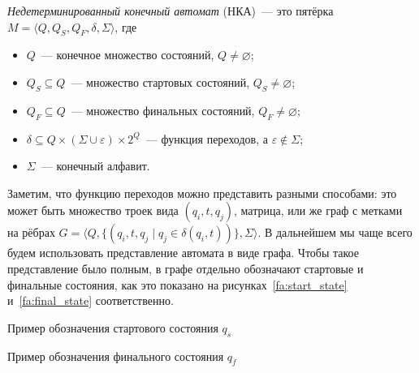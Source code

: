 \begin{definition}
    \label{def:NondeterminicticFiniteAutomata}
    \emph{Недетерминированный конечный автомат} (НКА)~--- это пятёрка $M = \langle Q, Q_S, Q_F, \delta, \Sigma \rangle$, где
    \begin{itemize}
        \item $Q$~--- конечное множество состояний, $Q \neq \varnothing$;
        \item $Q_S \subseteq Q$~--- множество стартовых состояний, $Q_S \neq \varnothing$;
        \item $Q_F \subseteq Q$~--- множество финальных состояний, $Q_F \neq \varnothing$;
        \item $\delta \subseteq Q \times (\Sigma \cup \varepsilon) \times 2^Q$~--- функция переходов, а $\varepsilon \notin \Sigma$;
        \item $\Sigma$~--- конечный алфавит.
    \end{itemize}
\end{definition}

Заметим, что функцию переходов можно представить разными способами: это может быть множество троек вида $(q_i, t, q_j)$, матрица, или же граф с метками на рёбрах $G = \langle Q, \{(q_i,t,q_j \mid q_j \in \delta(q_i,t))\}, \Sigma \rangle$.
В дальнейшем мы чаще всего будем использовать представление автомата в виде графа.
Чтобы такое представление было полным, в графе отдельно обозначают стартовые и финальные состояния, как это показано на рисунках~\ref{fa:start_state} и~\ref{fa:final_state} соответственно.
\begin{marginfigure}    
    \begin{center}
    \end{center}
    \caption{Пример обозначения стартового состояния $q_s$}
    \label{fa:start_state}
\end{marginfigure}
\begin{marginfigure}    
    \begin{center}
    \end{center}
    \caption{Пример обозначения финального состояния $q_f$}
    \label{fa:final_state}
\end{marginfigure}

